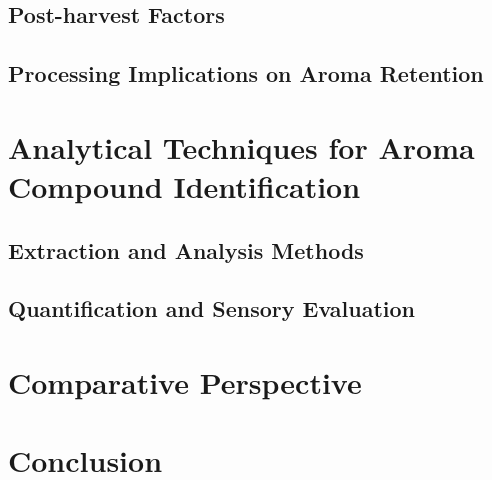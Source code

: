 \subsection{Post-harvest Factors}
\subsection{Processing Implications on Aroma Retention}


\section{Analytical Techniques for Aroma Compound Identification}
\subsection{Extraction and Analysis Methods}
\subsection{Quantification and Sensory Evaluation}

\section{Comparative Perspective}

\section{Conclusion}
